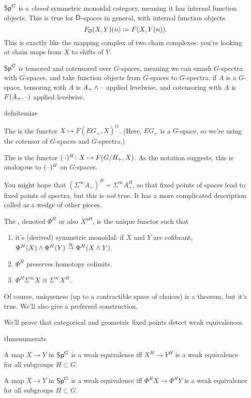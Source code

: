 $\mathsf{Sp}^G$ is a \emph{closed} symmetric monoidal category, meaning it has internal function objects. This is true for
$\mathsf D$-spaces in general, with internal function objects
\[F_\mathsf D(X,Y)(n) \coloneqq F(X, Y(n)).\]
This is exactly like the mapping complex of two chain complexes: you're looking at chain maps from $X$ to shifts of
$Y$.

$\mathsf{Sp}^G$ is tensored and cotensored over $G$-spaces, meaning we can smash $G$-spectra with $G$-spaces, and take
function objects from $G$-spaces to $G$-spectra: if $A$ is a $G$-space, tensoring with $A$ is $A_+\wedge\text{--}$
applied levelwise, and cotensoring with $A$ is $F(A_+,\text{--})$ applied levelwise.
\begin{comp}{defn}{itemize}
	\item The  is the functor $X\mapsto F(EG_+, X)^G$. (Here, $EG_+$ is a $G$-space, so
	we're using the cotensor of $G$-spaces and $G$-spectra.)
	\item The  is the functor $(\bl)^H\colon X\mapsto F(G/H_+, X)$. As the notation
	suggests, this is analogous to $(\text{--})^H$ on $G$-spaces.
\end{comp}
\begin{warn}
You might hope that $(\Sigma^\infty A_+)^H = \Sigma^\infty A_+^H$, so that fixed points of spaces lead to fixed
points of spectra, but this is \emph{not} true. It has a more complicated description called  as a wedge of other pieces.
\end{warn}
\begin{defn}
The , denoted $\Phi^H$ or also $X^{gH}$, is the unique functor
such that
\begin{enumerate}
	\item it's (derived) symmetric monoidal: if $X$ and $Y$ are cofibrant,
	$\Phi^H(X)\wedge\Phi^H(Y)\stackrel\cong\to\Phi^H(X\wedge Y)$.
	\item $\Phi^H$ preserves homotopy colimits.
	\item $\Phi^H\Sigma^\infty X \cong \Sigma^\infty X^H$.
\end{enumerate}
\end{defn}
Of course, uniqueness (up to a contractible space of choices) is a theorem, but it's true. We'll also give a
preferred construction.

We'll prove that categorical and geometric fixed points detect weak equivalences.
\begin{comp}{thm}{enumerate}
	\item A map $X\to Y$ in $\mathsf{Sp}^G$ is a weak equivalence iff $X^H\to Y^H$ is a weak equivalence for all subgroups
	$H\subset G$.
	\item A map $X\to Y$ in $\mathsf{Sp}^G$ is a weak equivalence iff $\Phi^H X\to \Phi^H Y$ is a weak equivalence for all
	subgroups $H\subset G$.
\end{comp}

